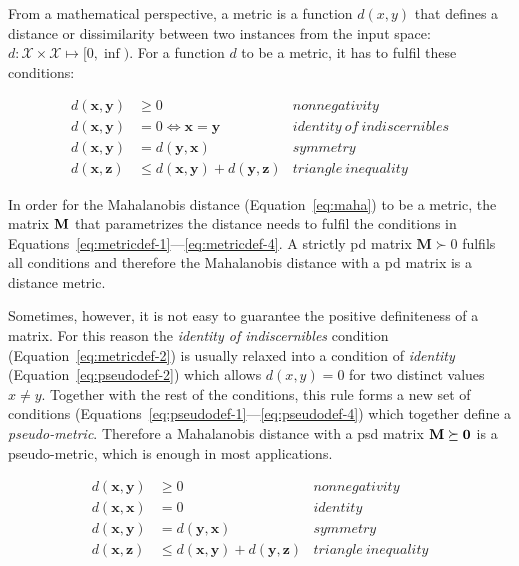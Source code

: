 \documentclass[12pt,a4paper]{report}
\begin{document}
From a mathematical perspective, a metric is a function $d(x,y)$ that defines a distance or dissimilarity between two instances from the input space: $d:\mathcal{X} \times \mathcal{X} \mapsto [0,\inf)$. For a function $d$ to be a metric, it has to fulfil these conditions:

\begin{align}
d(\textbf{x},\textbf{y}) &\geq 0 & nonnegativity \label{eq:metricdef-1} \\
d(\textbf{x},\textbf{y}) &= 0 \iff \textbf{x}=\textbf{y} & identity \ of \ indiscernibles \label{eq:metricdef-2} \\
d(\textbf{x},\textbf{y}) &= d(\textbf{y},\textbf{x}) & symmetry \label{eq:metricdef-3} \\
d(\textbf{x},\textbf{z}) &\leq d(\textbf{x},\textbf{y}) + d(\textbf{y},\textbf{z}) & triangle \ inequality \label{eq:metricdef-4}
\end{align} 

In order for the Mahalanobis distance (Equation~\ref{eq:maha}) to be a metric, the matrix $\bf{M}$ that parametrizes the distance needs to fulfil the conditions in Equations~\ref{eq:metricdef-1}---\ref{eq:metricdef-4}. A strictly \ac{pd} matrix $\bm{M} \succ 0$ fulfils all conditions and therefore the Mahalanobis distance with a \ac{pd} matrix is a distance metric.

Sometimes, however, it is not easy to guarantee the positive definiteness of a matrix. For this reason the \textit{identity of indiscernibles} condition (Equation~\ref{eq:metricdef-2}) is usually relaxed into a condition of \textit{identity} (Equation~\ref{eq:pseudodef-2}) which allows $d(x,y)=0$ for two distinct values $x \neq y$. Together with the rest of the conditions, this rule forms a new set of conditions (Equations~\ref{eq:pseudodef-1}---\ref{eq:pseudodef-4}) which together define a \textit{pseudo-metric}. Therefore a Mahalanobis distance with a \ac{psd} matrix $\bf{M} \succeq 0$ is a pseudo-metric, which is enough in most applications.

\begin{align}
d(\textbf{x},\textbf{y}) &\geq 0 & nonnegativity \label{eq:pseudodef-1} \\
d(\textbf{x},\textbf{x}) &= 0 & identity \label{eq:pseudodef-2} \\
d(\textbf{x},\textbf{y}) &= d(\textbf{y},\textbf{x}) & symmetry \label{eq:pseudodef-3} \\
d(\textbf{x},\textbf{z}) &\leq d(\textbf{x},\textbf{y}) + d(\textbf{y},\textbf{z}) & triangle \ inequality \label{eq:pseudodef-4}
\end{align} 
\end{document}
